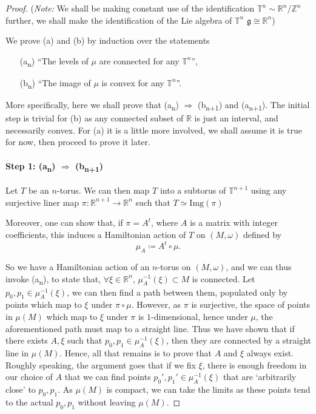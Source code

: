 \documentclass[11pt, final]{article}
\begin{document}
\begin{proof}
	(\textsl{Note:} We shall be making constant use of the identification $ \mathbb{T}^{n} \sim \mathbb{R}^n / \mathbb{Z}^n $ further, we shall make the identification of the Lie algebra of $ \mathbb{T}^n $ $ \mathfrak{g} \cong \mathbb{R}^n $)
	
	We prove (a) and (b) by induction over the statements
		\begin{itemize}
			\item[(a\textsubscript{n})] \enquote{The levels of $\mu$ are connected for any $ \mathbb{T}^n $},
			\item[(b\textsubscript{n})] \enquote{The image of $ \mu $ is convex for any $ \mathbb{T}^n $}.
		\end{itemize}
	More specifically, here we shall prove that (a\textsubscript{n}) $ \Rightarrow $ (b\textsubscript{n+1}) and (a\textsubscript{n+1}). The initial step is trivial for (b) as any connected subset of $ \mathbb{R} $ is just an interval, and necessarily convex. For (a) it is a little more involved, we shall assume it is true for now, then proceed to prove it later.
	
	\paragraph{Step 1: (a\textsubscript{n}) $ \Rightarrow $ (b\textsubscript{n+1})} Let $ T $ be an $ n $-torus. We can then map $ T $ into a subtorus of $ \mathbb{T}^{n+1} $ using any surjective liner map $ \pi: \mathbb{R}^{n+1} \to \mathbb{R}^n $ such that $ T \simeq \mathrm{Img}(\pi) $
	
	Moreover, one can show that, if $ \pi = A^t $, where $ A $ is a matrix with integer coefficients, this induces a Hamiltonian action of $ T $ on $ (M,\omega) $ defined by
		\begin{equation*}
		\mu_A \coloneqq A^t \circ \mu.
		\end{equation*}
	
	So we have a Hamiltonian action of an $ n $-torus on $ (M,\omega) $, and we can thus invoke (a\textsubscript{n}), to state that, $ \forall \xi \in \mathbb{R}^n $, $ \mu_A^{-1}(\xi) \subset M $ is connected. Let $ p_0, p_1 \in \mu_A^{-1}(\xi) $, we can then find a path between them, populated only by points which map to $ \xi $ under $ \pi \circ \mu$. However, as $ \pi $ is surjective, the space of points in $ \mu(M) $ which map to $ \xi $ under $ \pi $ is $ 1 $-dimensional, hence under $ \mu $, the aforementioned path must map to a straight line. Thus we have shown that if there exists $ A, \xi $ such that $ p_0, p_1 \in \mu_A^{-1}(\xi) $, then they are connected by a straight line in $ \mu(M) $. Hence, all that remains is to prove that $ A $ and $ \xi $ always exist. Roughly speaking, the argument goes that if we fix $ \xi $, there is enough freedom in our choice of $ A $ that we can find points $ p_0', p_1' \in \mu_A^{-1}(\xi)$ that are `arbitrarily close' to $ p_0, p_1 $. As $ \mu(M) $ is compact, we can take the limits as these points tend to the actual $ p_0, p_1 $ without leaving $ \mu(M) $.
	

\end{proof}
\end{document}
